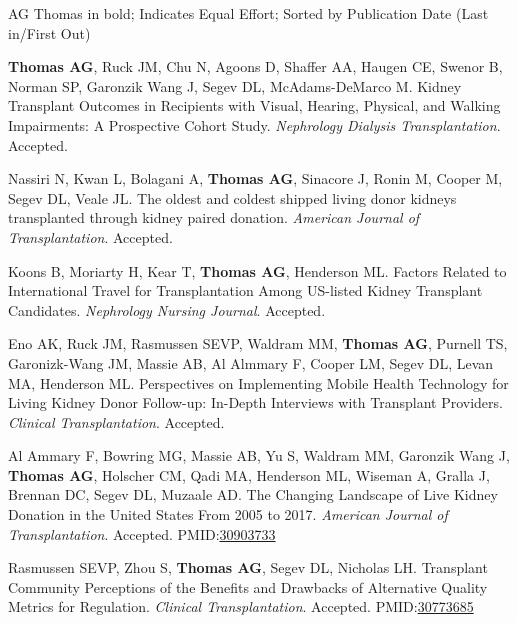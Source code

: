 \documentclass[10pt]{article}
\makeatletter
\newlength{\bibhang}
\newlength{\bibsep}
 {\@listi \global\bibsep\itemsep \global\advance\bibsep by\parsep}
\newenvironment{bibenum*}
  {\renewcommand\labelenumi{[\theenumi]}%
   \etaremune[
     topsep=0pt,
     itemsep=\bibsep,
     parsep=0pt,partopsep=0pt,
     itemindent=-\bibhang,
     leftmargin={\bibhang+\widthof{[999]}}]}
  {\endetaremune}
\newcommand{\pmid}[1]{PMID:\href{https://www.ncbi.nlm.nih.gov/pubmed/#1}{#1}}
\makeatother
\begin{document}
  AG Thomas in bold; \textbf{\dag} Indicates Equal Effort;
  Sorted by Publication Date (Last in/First Out)

\vspace{2mm}

\begin{bibenum*}

\item \textbf{Thomas AG}, Ruck JM, Chu N, Agoons D, Shaffer AA, Haugen CE,
  Swenor B, Norman SP, Garonzik Wang J, Segev DL, McAdams-DeMarco M.
  Kidney Transplant Outcomes in Recipients with Visual, Hearing,
  Physical, and Walking Impairments: A Prospective Cohort Study.
  \emph{Nephrology Dialysis Transplantation}. Accepted.

\item Nassiri N, Kwan L, Bolagani A, \textbf{Thomas AG}, Sinacore J, Ronin M,
  Cooper M, Segev DL, Veale JL.
  The oldest and coldest shipped living donor kidneys transplanted
  through kidney paired donation.
  \emph{American Journal of Transplantation}. Accepted.

\item Koons B, Moriarty H, Kear T, \textbf{Thomas AG}, Henderson ML.
  Factors Related to International Travel for Transplantation Among US-listed
  Kidney Transplant Candidates.
  \emph{Nephrology Nursing Journal}. Accepted.

\item Eno AK, Ruck JM, Rasmussen SEVP, Waldram MM, \textbf{Thomas AG},
  Purnell TS, Garonizk-Wang JM, Massie AB, Al Almmary F, Cooper LM,
  Segev DL, Levan MA, Henderson ML.
  Perspectives on Implementing Mobile Health Technology for Living Kidney
  Donor Follow-up: In-Depth Interviews with Transplant Providers.
  \emph{Clinical Transplantation}. Accepted.

\item Al Ammary F, Bowring MG, Massie AB, Yu S, Waldram MM, Garonzik Wang J,
  \textbf{Thomas AG}, Holscher CM, Qadi MA, Henderson ML, Wiseman A,
  Gralla J, Brennan DC, Segev DL, Muzaale AD.
  The Changing Landscape of Live Kidney Donation in the United States
  From 2005 to 2017.
  \emph{American Journal of Transplantation}. Accepted.
  \pmid{30903733} 

\item Rasmussen SEVP, Zhou S, \textbf{Thomas AG},
  Segev DL, Nicholas LH.
  Transplant Community Perceptions of the Benefits and Drawbacks of
  Alternative Quality Metrics for Regulation.
  \emph{Clinical Transplantation}. Accepted.
  \pmid{30773685} 


\end{bibenum*}
\end{document}
